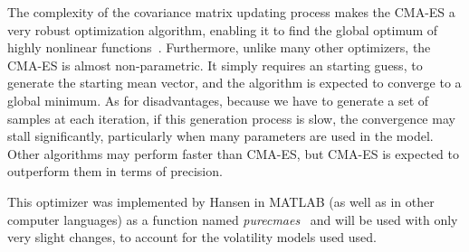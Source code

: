 The complexity of the covariance matrix updating process makes the CMA-ES a very robust optimization algorithm, enabling it to find the global optimum of highly nonlinear functions~\cite{DilaoCMA}.
Furthermore, unlike many other optimizers, the CMA-ES is almost non-parametric. It simply requires an starting guess, to generate the starting mean vector, and the algorithm is expected to converge to a global minimum.
As for disadvantages, because we have to generate a set of samples at each iteration, if this generation process is slow, the convergence may stall significantly, particularly when many parameters are used in the model. Other algorithms may perform faster than CMA-ES, but CMA-ES is expected to outperform them in terms of precision.

This optimizer was implemented by Hansen in MATLAB (as well as in other computer languages) as a function named \emph{purecmaes}~\cite{CMAES} and will be used with only very slight changes, to account for the volatility models used used.


